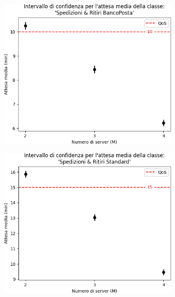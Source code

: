 \documentclass[
	usepdftitle=false,
	xcolor={table, dvipsnames},
	hyperref={
		pdftitle={Studio delle prestazioni di un Ufficio Postale ispirato a Poste Italiane},
    	pdfauthor={A. Chillotti, C. Cuffaro e S. Tiberi}
    }
]{beamer}
\begin{document}
\begin{frame}
\begin{figure}[ht]
\begin{subfigure}[b]{0.3\textwidth}
\includegraphics[width=\textwidth]{plots/d4-trans}   
\end{subfigure}
\begin{subfigure}[b]{0.3\textwidth}   
\centering 
\includegraphics[width=\textwidth]{plots/d5-trans}
\end{subfigure}
\end{figure}
\end{frame}
\end{document}
